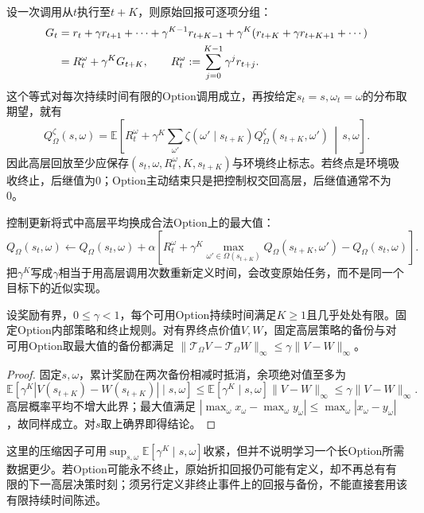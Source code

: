 设一次调用从$t$执行至$t+K$，则原始回报可逐项分组：
\begin{align}
 G_t
   &=r_t+\gamma r_{t+1}+\cdots+\gamma^{K-1}r_{t+K-1}
          +\gamma^K(r_{t+K}+\gamma r_{t+K+1}+\cdots)\notag\\
   &=R_t^\omega+\gamma^K G_{t+K},\qquad
 R_t^\omega:=\sum_{j=0}^{K-1}\gamma^j r_{t+j}.
 \label{eq:rl-learning-option-grouping}
\end{align}
这个等式对每次持续时间有限的Option调用成立，再按给定$s_t=s,\omega_t=\omega$的分布取期望，就有
\begin{equation}
 Q^\zeta_\Omega(s,\omega)
  =\mathbb E\left[
       R_t^\omega+\gamma^K
          \sum_{\omega'}\zeta(\omega'\mid s_{t+K})
                       Q^\zeta_\Omega(s_{t+K},\omega')
                    \,\middle|\,s,\omega\right].
 \label{eq:rl-learning-option-bellman}
\end{equation}
因此高层回放至少应保存$(s_t,\omega,R_t^\omega,K,s_{t+K})$与环境终止标志。若终点是环境吸收终止，后继值为0；Option主动结束只是把控制权交回高层，后继值通常不为0。

控制更新将式中高层平均换成合法Option上的最大值：
\[
 Q_\Omega(s_t,\omega)\leftarrow Q_\Omega(s_t,\omega)+
  \alpha\left[R_t^\omega+
        \gamma^K\max_{\omega'\in\Omega(s_{t+K})}
                          Q_\Omega(s_{t+K},\omega')
                     -Q_\Omega(s_t,\omega)\right].
\]
把$\gamma^K$写成$\gamma$相当于用高层调用次数重新定义时间，会改变原始任务，而不是同一个目标下的近似实现。

\begin{theorem}[Option备份的压缩性]
  \label{thm:rl-learning-option-contraction}
  设奖励有界，$0\leq\gamma<1$，每个可用Option持续时间满足$K\geq1$且几乎处处有限。固定Option内部策略和终止规则。对有界终点价值$V,W$，固定高层策略的备份与对可用Option取最大值的备份都满足
  $\|\mathcal T_\Omega V-\mathcal T_\Omega W\|_\infty
    \leq\gamma\|V-W\|_\infty$。
\end{theorem}

\begin{proof}
  固定$s,\omega$，累计奖励在两次备份相减时抵消，余项绝对值至多为
  \[
    \mathbb E[\gamma^K|V(s_{t+K})-W(s_{t+K})|\mid s,\omega]
      \leq\mathbb E[\gamma^K\mid s,\omega]\|V-W\|_\infty
      \leq\gamma\|V-W\|_\infty.
  \]
  高层概率平均不增大此界；最大值满足
  $|\max_\omega x_\omega-\max_\omega y_\omega|
       \leq\max_\omega|x_\omega-y_\omega|$，故同样成立。对$s$取上确界即得结论。
\end{proof}

这里的压缩因子可用$\sup_{s,\omega}\mathbb E[\gamma^K\mid s,\omega]$收紧，但并不说明学习一个长Option所需数据更少。若Option可能永不终止，原始折扣回报仍可能有定义，却不再总有有限的下一高层决策时刻；须另行定义非终止事件上的回报与备份，不能直接套用该有限持续时间陈述。

